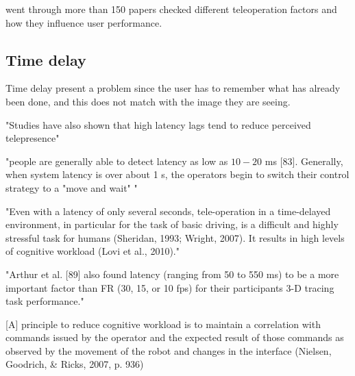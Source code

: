 \citep{Chen2007} went through more than 150 papers checked different teleoperation factors and how they influence user performance.



\subsection{Time delay}



Time delay present a problem since the user has to remember what has already been done, and this does not match with the image they are seeing.

\citep{Chen2007} "Studies have also shown that high latency lags tend to reduce perceived telepresence"

\citep{Chen2007} "people are generally able to detect latency as low as $10-20$ ms [83]. Generally, when system latency is over about 1 s, the operators begin to switch their control strategy to a "move and wait" "

\citep{Matheson2013} "Even with a latency of only several seconds, tele-operation in a time-delayed environment, in particular for the task of basic driving, is a difficult and highly stressful task for humans (Sheridan, 1993; Wright, 2007). It results in high levels of cognitive workload (Lovi et al., 2010)."

"Arthur et al. [89] also found latency (ranging from 50 to 550 ms) to be a more important factor than FR (30, 15, or 10 fps) for their participants 3-D tracing task performance."

[A] principle to reduce cognitive workload is to maintain a correlation with commands issued by the operator and the expected result of those commands as observed by the movement of the robot and changes in the interface (Nielsen, Goodrich, \& Ricks, 2007, p. 936)

